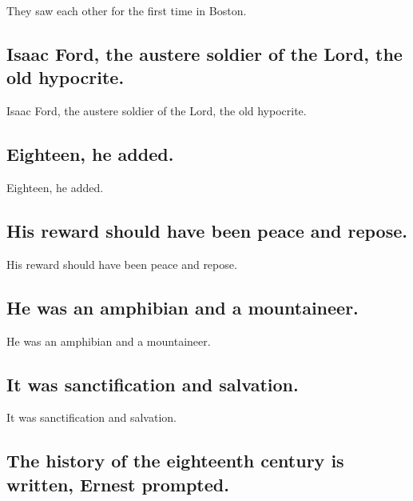 \documentclass[]{article}
\begin{document}
They saw each other for the first time in Boston.

\hypertarget{isaac-ford-the-austere-soldier-of-the-lord-the-old-hypocrite.}{%
\subsection{Isaac Ford, the austere soldier of the Lord, the old
hypocrite.}\label{isaac-ford-the-austere-soldier-of-the-lord-the-old-hypocrite.}}

Isaac Ford, the austere soldier of the Lord, the old hypocrite.

\hypertarget{eighteen-he-added.}{%
\subsection{Eighteen, he added.}\label{eighteen-he-added.}}

Eighteen, he added.

\hypertarget{his-reward-should-have-been-peace-and-repose.}{%
\subsection{His reward should have been peace and
repose.}\label{his-reward-should-have-been-peace-and-repose.}}

His reward should have been peace and repose.

\hypertarget{he-was-an-amphibian-and-a-mountaineer.}{%
\subsection{He was an amphibian and a
mountaineer.}\label{he-was-an-amphibian-and-a-mountaineer.}}

He was an amphibian and a mountaineer.

\hypertarget{it-was-sanctification-and-salvation.}{%
\subsection{It was sanctification and
salvation.}\label{it-was-sanctification-and-salvation.}}

It was sanctification and salvation.

\hypertarget{the-history-of-the-eighteenth-century-is-written-ernest-prompted.}{%
\subsection{The history of the eighteenth century is written, Ernest
prompted.}\label{the-history-of-the-eighteenth-century-is-written-ernest-prompted.}}
\end{document}
